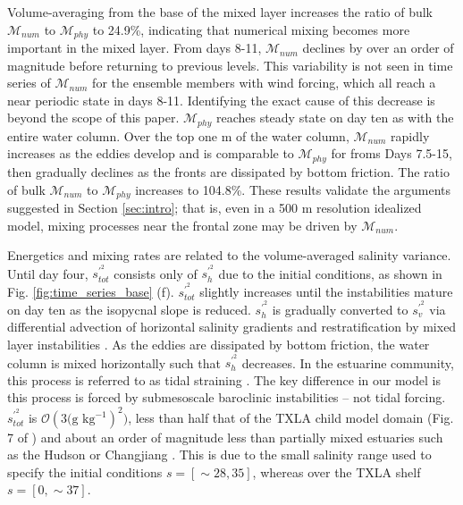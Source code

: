 Volume-averaging from the base of the mixed layer increases the ratio of bulk $\mathcal{M}_{num}$ to $\mathcal{M}_{phy}$ to 24.9\%, indicating that numerical mixing becomes more important in the mixed layer. From days 8-11, $\mathcal{M}_{num}$ declines by over an order of magnitude before returning to previous levels. This variability is not seen in time series of $\mathcal{M}_{num}$ for the ensemble members with wind forcing, which all reach a near periodic state in days 8-11. Identifying the exact cause of this decrease is beyond the scope of this paper. $\mathcal{M}_{phy}$ reaches steady state on day ten as with the entire water column. Over the top one m of the water column, $\mathcal{M}_{num}$ rapidly increases as the eddies develop and is comparable to $\mathcal{M}_{phy}$ for froms Days 7.5-15, then gradually declines as the fronts are dissipated by bottom friction. The ratio of bulk $\mathcal{M}_{num}$ to $\mathcal{M}_{phy}$ increases to 104.8\%. These results validate the arguments suggested in Section \ref{sec:intro}; that is, even in a 500 m resolution idealized model, mixing processes near the frontal zone may be driven by $\mathcal{M}_{num}$. 

Energetics and mixing rates are related to the volume-averaged salinity variance. Until day four, $s_{tot}^{\prime^2}$ consists only of $s_{h}^{\prime^2}$ due to the initial conditions, as shown in Fig. \ref{fig:time_series_base} (f).  $s_{tot}^{\prime^2}$ slightly increases until the instabilities mature on day ten as the isopycnal slope is reduced.  $s_{h}^{\prime^2}$ is gradually converted to $s_{v}^{\prime^2}$ via differential advection of horizontal salinity gradients \citep{Li_2018} and restratification by mixed layer instabilities \citep{boccaletti2007mixed}. As the eddies are dissipated by bottom friction, the water column is mixed horizontally such that $s_{h}^{\prime^2}$ decreases. In the estuarine community, this process is referred to as tidal straining \citep{simpson1990tidal}. The key difference in our model is this process is forced by submesoscale baroclinic instabilities -- not tidal forcing. $s_{tot}^{\prime^2}$ is $\mathcal{O}(3 \text{(g kg}{^{-1}})^{2})$, less than half that of the TXLA child model domain (Fig. 7 of \citet{Schlichting23}) and about an order of magnitude less than partially mixed estuaries such as the Hudson or Changjiang \citep{Li_2018, Warner_2020}. This is due to the small salinity range used to specify the initial conditions $s = [\sim 28,35]$, whereas over the TXLA shelf $s = [0,\sim 37]$. 

